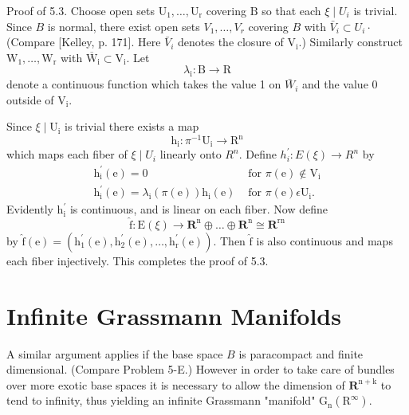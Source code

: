 \documentclass[10pt]{article}
\begin{document}
Proof of 5.3. Choose open sets $\mathrm{U}_{1}, \ldots, \mathrm{U}_{\mathrm{r}}$ covering $\mathrm{B}$ so that each $\xi \mid U_{i}$ is trivial. Since $B$ is normal, there exist open sets $V_{1}, \ldots, V_{r}$ covering $B$ with $\bar{V}_{i} \subset U_{i} \cdot$ (Compare [Kelley, p. 171]. Here $\bar{V}_{i}$ denotes the closure of $\mathrm{V}_{\mathrm{i}}$.) Similarly construct $\mathrm{W}_{1}, \ldots, \mathrm{W}_{\mathrm{r}}$ with $\overline{\mathrm{W}}_{\mathrm{i}} \subset \mathrm{V}_{\mathrm{i}}$. Let
$$
\lambda_{\mathrm{i}}: \mathrm{B} \rightarrow \mathrm{R}
$$
denote a continuous function which takes the value 1 on $\bar{W}_{i}$ and the value 0 outside of $\mathrm{V}_{\mathrm{i}}$.

Since $\xi \mid \mathrm{U}_{\mathrm{i}}$ is trivial there exists a map
$$
\mathrm{h}_{\mathrm{i}}: \pi^{-1} \mathrm{U}_{\mathrm{i}} \rightarrow \mathrm{R}^{\mathrm{n}}
$$
which maps each fiber of $\xi \mid U_{i}$ linearly onto $R^{n}$. Define $h_{i}^{\prime}: E(\xi) \rightarrow R^{n}$ by
$$
\begin{array}{ll}
\mathrm{h}_{\mathrm{i}}^{\prime}(\mathrm{e})=0 & \text { for } \pi(\mathrm{e}) \notin \mathrm{V}_{\mathrm{i}} \\
\mathrm{h}_{\mathrm{i}}^{\prime}(\mathrm{e})=\lambda_{\mathrm{i}}(\pi(\mathrm{e})) \mathrm{h}_{\mathrm{i}}(\mathrm{e}) & \text { for } \pi(\mathrm{e}) \epsilon \mathrm{U}_{\mathrm{i}} .
\end{array}
$$
Evidently $\mathrm{h}_{\mathrm{i}}^{\prime}$ is continuous, and is linear on each fiber. Now define
$$
\hat{\mathrm{f}}: \mathrm{E}(\xi) \rightarrow \mathbf{R}^{\mathrm{n}} \oplus \ldots \oplus \mathbf{R}^{\mathrm{n}} \cong \mathbf{R}^{\mathrm{rn}}
$$
by $\hat{\mathrm{f}}(\mathrm{e})=\left(\mathrm{h}_{1}^{\prime}(\mathrm{e}), \mathrm{h}_{2}^{\prime}(\mathrm{e}), \ldots, \mathrm{h}_{\mathrm{r}}^{\prime}(\mathrm{e})\right)$. Then $\hat{\mathrm{f}}$ is also continuous and maps each fiber injectively. This completes the proof of 5.3.

\section{Infinite Grassmann Manifolds}
A similar argument applies if the base space $B$ is paracompact and finite dimensional. (Compare Problem 5-E.) However in order to take care of bundles over more exotic base spaces it is necessary to allow the dimension of $\mathbf{R}^{\mathrm{n}+\mathrm{k}}$ to tend to infinity, thus yielding an infinite Grassmann "manifold" $\mathrm{G}_{\mathrm{n}}\left(\mathrm{R}^{\infty}\right)$.
\end{document}
